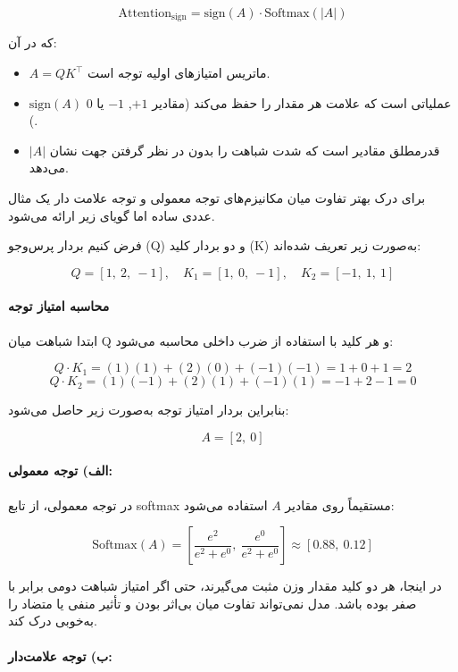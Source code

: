 \begin{equation}
	\text{Attention}_{\text{sign}} = \text{sign}(A) \cdot \text{Softmax}(|A|)
\end{equation}


که در آن:
\begin{itemize}
	\item $A = QK^\top$ ماتریس امتیازهای اولیه توجه است.
	\item $\text{sign}(A)$ عملیاتی است که علامت هر مقدار را حفظ می‌کند (مقادیر $+1$, $-1$ یا $0$).
	\item $|A|$ قدرمطلق مقادیر است که شدت شباهت را بدون در نظر گرفتن جهت نشان می‌دهد.
\end{itemize}


برای درک بهتر تفاوت میان مکانیزم‌های توجه معمولی و توجه علامت دار یک مثال عددی ساده اما گویای زیر ارائه می‌شود.

فرض کنیم  بردار پرس‌وجو (Q) و دو بردار کلید (K) به‌صورت زیر تعریف شده‌اند:

\[
Q = [1,\ 2,\ -1], \quad
K_1 = [1,\ 0,\ -1], \quad
K_2 = [-1,\ 1,\ 1]
\]

\paragraph{محاسبه امتیاز توجه}

ابتدا شباهت میان Q و هر کلید با استفاده از ضرب داخلی محاسبه می‌شود:

\[
Q \cdot K_1 = (1)(1) + (2)(0) + (-1)(-1) = 1 + 0 + 1 = 2
\]
\[
Q \cdot K_2 = (1)(-1) + (2)(1) + (-1)(1) = -1 + 2 -1 = 0
\]

بنابراین بردار امتیاز توجه به‌صورت زیر حاصل می‌شود:

\[
A = [2,\ 0]
\]

\paragraph{الف) توجه معمولی:}

در توجه معمولی، از تابع softmax مستقیماً روی مقادیر $A$ استفاده می‌شود:

\[
\text{Softmax}(A) =
\left[
\frac{e^2}{e^2 + e^0},\ 
\frac{e^0}{e^2 + e^0}
\right]
\approx [0.88,\ 0.12]
\]

در اینجا، هر دو کلید مقدار وزن مثبت می‌گیرند، حتی اگر امتیاز شباهت دومی برابر با صفر بوده باشد. مدل نمی‌تواند تفاوت میان بی‌اثر بودن و تأثیر منفی یا متضاد را به‌خوبی درک کند.

\paragraph{ب) توجه علامت‌دار:}

